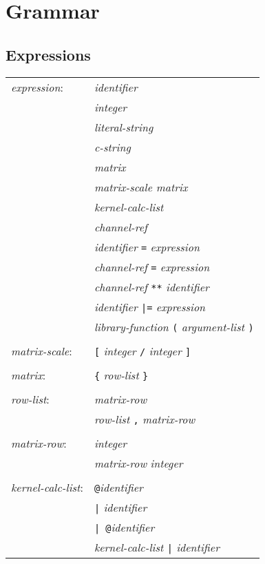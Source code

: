 \section{Grammar}

\subsection{Expressions}

\begin{center}\begin{tabular}{l l}
\emph{expression}: & \emph{identifier}\\
& \emph{integer}\\
& \emph{literal-string}\\
& \emph{c-string}\\
& \emph{matrix}\\
& \emph{matrix-scale matrix}\\
& \emph{kernel-calc-list}\\
& \emph{channel-ref}\\
& \emph{identifier} \texttt{=} \emph{expression}\\
& \emph{channel-ref} \texttt{=} \emph{expression}\\
& \emph{channel-ref} \texttt{**} \emph{identifier}\\
& \emph{identifier} \texttt{|=} \emph{expression}\\
& \emph{library-function} \texttt{(} \emph{argument-list} \texttt{)}\\
\\
\emph{matrix-scale}: & \texttt{[} \emph{integer} \texttt{/} \emph{integer} \texttt{]}\\
\\
\emph{matrix}: & \texttt{\{} \emph{row-list} \texttt{\}}\\
\\
\emph{row-list}: & \emph{matrix-row}\\
& \emph{row-list} \texttt{,} \emph{matrix-row}\\
\\
\emph{matrix-row}: & \emph{integer}\\
& \emph{matrix-row} \emph{integer}\\
\\
\emph{kernel-calc-list}: & \texttt{@}\emph{identifier}\\
& \texttt{|} \emph{identifier}\\
& \texttt{| @}\emph{identifier}\\
& \emph{kernel-calc-list} \texttt{|} \emph{identifier}\\

\end{tabular}
\end{center}
